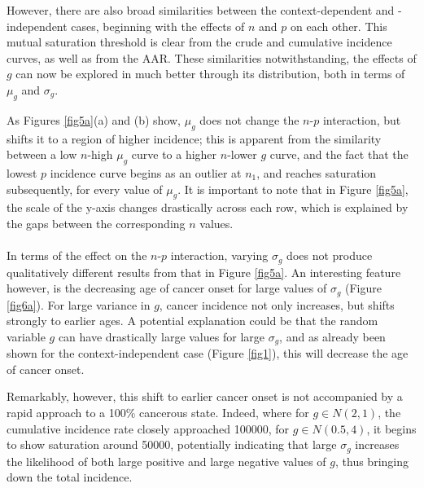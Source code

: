 \documentclass[12pt, onecolumn]{article}
\begin{document}
	However, there are also broad similarities between the context-dependent and -independent cases, beginning with the effects of $n$ and $p$ on each other. This mutual saturation threshold is clear from the crude and cumulative incidence curves, as well as from the AAR. These similarities notwithstanding, the effects of $g$ can now be explored in much better through its distribution, both in terms of $\mu_{g}$ and $\sigma_{g}$.
	
	As Figures \ref{fig5a}(a) and (b) show, $\mu_{g}$ does not change the $n$-$p$ interaction, but shifts it to a region of higher incidence; this is apparent from the similarity between a low $n$-high $\mu_{g}$ curve to a higher $n$-lower $g$ curve, and the fact that the lowest $p$ incidence curve begins as an outlier at $n_{1}$, and reaches saturation subsequently, for every value of $\mu_{g}$. It is important to note that in Figure \ref{fig5a}, the scale of the y-axis changes drastically across each row, which is explained by the gaps between the corresponding $n$ values.
	
	\paragraph{\empty}In terms of the effect on the $n$-$p$ interaction, varying $\sigma_{g}$ does not produce qualitatively different results from that in Figure \ref{fig5a}. An interesting feature however, is the decreasing age of cancer onset for large values of $\sigma_{g}$ (Figure \ref{fig6a}). For large variance in $g$, cancer incidence not only increases, but shifts strongly to earlier ages. A potential explanation could be that the random variable $g$ can have drastically large values for large $\sigma_{g}$, and as already been shown for the context-independent case (Figure \ref{fig1}), this will decrease the age of cancer onset.
	
	Remarkably, however, this shift to earlier cancer onset is not accompanied by a rapid approach to a 100\% cancerous state. Indeed, where for $g \in N(2,1)$, the cumulative incidence rate closely approached 100000, for $g \in N(0.5,4)$, it begins to show saturation around 50000, potentially indicating that large $\sigma_{g}$ increases the likelihood of both large positive and large negative values of $g$, thus bringing down the total incidence.
	
\end{document}
